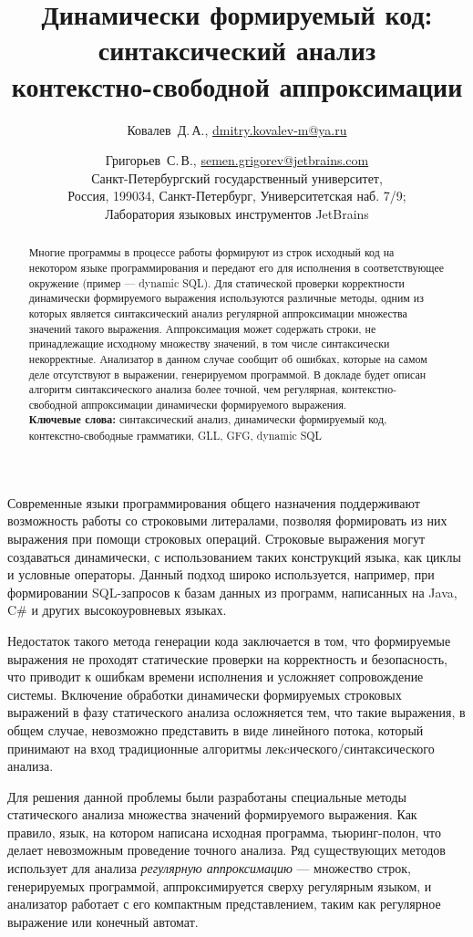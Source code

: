 \documentclass [a4paper] {article}
\title %
  {Динамически формируемый код: синтаксический анализ \\ контекстно-свободной аппроксимации}
\author %
{%
  Ковалев~Д.\,А., \url {dmitry.kovalev-m@ya.ru} \and %
  Григорьев~С.\,В., \url {semen.grigorev@jetbrains.com} \\
  Санкт-Петербургский государственный университет, \\
  Россия, 199034, Санкт-Петербург, Университетская наб. 7/9; \\
  Лаборатория языковых инструментов JetBrains
}%
\date {}
\begin{document}

\maketitle

\begin {abstract}
	Многие программы в процессе работы формируют из строк исходный код на некотором языке программирования и передают его для исполнения в соответствующее окружение (пример --- dynamic SQL). 
	Для статической проверки корректности динамически формируемого выражения используются различные методы, одним из которых является синтаксический анализ регулярной аппроксимации множества значений такого выражения.
	Аппроксимация может содержать строки, не принадлежащие исходному множеству значений, в том числе синтаксически некорректные. 
	Анализатор в данном случае сообщит об ошибках, которые на самом деле отсутствуют в выражении, генерируемом программой.
	В докладе будет описан алгоритм синтаксического анализа более точной, чем регулярная, контекстно-свободной аппроксимации динамически формируемого выражения.
  \\ \textbf {Ключевые слова:} синтаксический анализ, динамически формируемый код, контекстно-свободные грамматики, GLL, GFG, dynamic SQL
\end {abstract}

Современные языки программирования общего назначения поддерживают возможность работы со строковыми литералами, позволяя формировать из них выражения при помощи строковых операций. 
Строковые выражения могут создаваться динамически, с использованием таких конструкций языка, как циклы и условные операторы. 
Данный подход широко используется, например, при формировании SQL-запросов к базам данных из программ, написанных на Java, C$\#$ и других высокоуровневых языках.

Недостаток такого метода генерации кода заключается в том, что формируемые выражения не проходят статические проверки на корректность и безопасность, что приводит к ошибкам времени исполнения и усложняет  сопровождение системы. 
Включение обработки динамически формируемых строковых выражений в фазу статического анализа осложняется тем, что такие выражения, в общем случае, невозможно представить в виде линейного потока, который принимают на вход традиционные алгоритмы лекcического/синтаксического анализа. 

Для решения данной проблемы были разработаны специальные методы статического анализа множества значений формируемого выражения. 
Как правило, язык, на котором написана исходная программа, тьюринг-полон, что делает невозможным проведение точного анализа.
Ряд существующих методов использует для анализа \textit{регулярную аппроксимацию} --- множество строк, генерируемых программой, аппроксимируется сверху регулярным языком, и анализатор работает с его компактным представлением, таким как регулярное выражение или конечный автомат.
\end{document}
